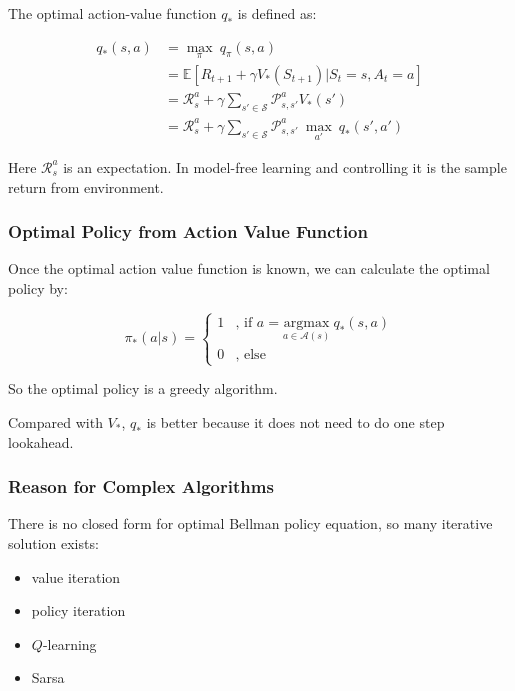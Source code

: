 The optimal action-value function $q_*$ is defined as:

\begin{equation}
	\begin{aligned}
		q_*(s,a)&=\underset{\pi}{\max}\ q_{\pi}(s,a)\\
		&=\mathbb{E}[R_{t+1}+\gamma V_*(S_{t+1})|S_t=s, A_t=a]\\		
		&=\mathcal{R}_s^a+\gamma \sum_{s' \in \mathcal{S}} \mathcal{P}_{s,s'}^a V_*(s')\\
		&=\mathcal{R}_s^a+\gamma \sum_{s' \in \mathcal{S}} \mathcal{P}_{s,s'}^a \ \underset{a'}{\max}\  q_*(s',a')
	\end{aligned}
\end{equation}

Here $\mathcal{R}_s^a$ is an expectation. In model-free learning and controlling it is the sample return from environment.

\subsubsection{Optimal Policy from Action Value Function} Once the optimal action value function is known, we can calculate the optimal policy by:

\begin{equation}\label{optimal:policy}
	\pi_*(a|s) =
	\begin{cases}
		1& \text{, if $a = \underset{a \in \mathcal{A}(s)}{\text{argmax}}\ q_*(s,a)$}\\
		0& \text{, else}
	\end{cases}
\end{equation}

So the optimal policy is a greedy algorithm.

Compared with $V_*$, $q_*$ is better because it does not need to do one step lookahead.

\subsubsection{Reason for Complex Algorithms}

There is no closed form for optimal Bellman policy equation, so many iterative solution exists:
\begin{itemize}
	\item value iteration
	\item policy iteration
	\item $Q$-learning
	\item Sarsa
\end{itemize}

